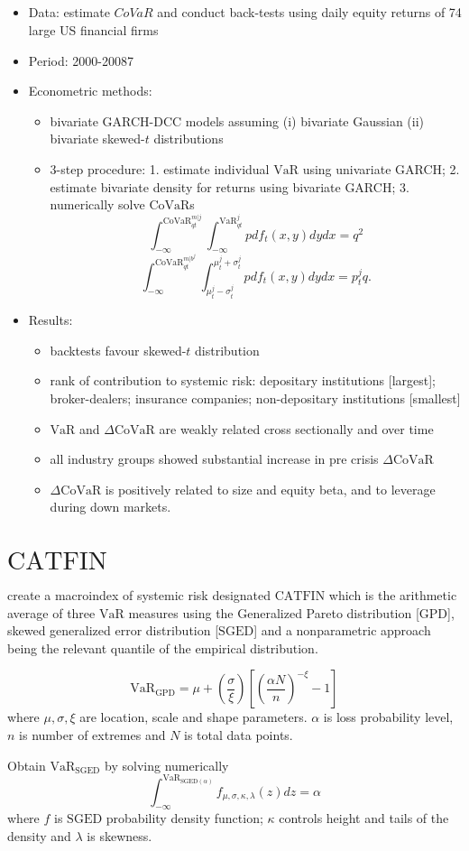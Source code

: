 \documentclass[authoryear]{elsarticle}
\newcommand{\bi}{\begin{itemize}}
\newcommand{\ei}{\end{itemize}}
\renewcommand{\i}{\item}
\newcommand{\var}{\ensuremath{\mathrm{VaR}}}
\newcommand{\covar}{\ensuremath{\mathrm{CoVaR}}}
\newcommand{\cat}{\ensuremath{\mathrm{CATFIN}}}
\newcommand{\sged}{\ensuremath{\mathrm{SGED}}}
\newcommand{\gpd}{\ensuremath{\mathrm{GPD}}}
\begin{document}
\subsection{\cite{Girardi2013}}
\bi
\i Data:  estimate $CoVaR$ and conduct back-tests using daily equity returns of 74 large US financial firms 
\i Period:  2000-20087 
\i Econometric methods:  
\bi
\i bivariate GARCH-DCC models assuming (i) bivariate Gaussian (ii) bivariate skewed-$t$ distributions
\i 3-step procedure: 1. estimate individual $\var$ using univariate GARCH; 2. estimate bivariate density for returns using bivariate GARCH; 3. numerically solve $\covar$s
$$\int_{-\infty}^{\covar_{qt}^{m|j}}\int_{-\infty}^{\var_{qt}^{j}}pdf_t(x,y)dydx=q^2$$
$$\int_{-\infty}^{\covar_{qt}^{m|b^j}}\int_{\mu_t^j - \sigma_t^j}^{\mu_t^j + \sigma_t^j} pdf_t(x,y)dydx=p_t^j q.$$
\ei

\i Results:
\bi
\i backtests favour skewed-$t$ distribution 
\i rank of contribution to systemic risk: depositary institutions [largest]; broker-dealers; insurance companies; non-depositary institutions [smallest]
\i $\var$ and $\Delta \covar$ are weakly related cross sectionally and over time
\i all industry groups showed substantial increase in pre crisis $\Delta \covar$ 
\i $\Delta \covar$ is positively related to size and equity beta, and to leverage during down markets.
\ei
\ei 



\section{$\cat$}

\cite{Allen2012} create a macroindex of systemic risk designated $\cat$  which is the arithmetic average of three $\var$ measures using the Generalized Pareto distribution [$\gpd$], skewed generalized error distribution [$\sged$] and a nonparametric approach being the relevant quantile of the empirical distribution. 

$$\var_{\gpd} =\mu + \left(\frac{\sigma}{\xi} \right) \left[  \left(\frac{\alpha N}{n} \right)^{-\xi} -1\right]  $$ where $\mu,\sigma,\xi$ are location, scale and shape parameters. $\alpha$ is loss probability level, $n$ is number of extremes and $N$ is total data points.

Obtain $\var_{\sged}$ by solving numerically
$$\int_{-\infty}^{\var_{\sged(\alpha)}}f_{\mu,\sigma,\kappa,\lambda}(z)dz=\alpha$$
where $f$ is $\sged$ probability density function; $\kappa$ controls height and tails of the density and $\lambda$ is skewness.
\end{document}
